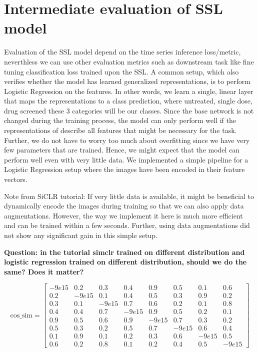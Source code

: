\documentclass[12pt,twoside,a4paper,parskip]{scrbook} %
\begin{document}
\section{Intermediate evaluation of SSL model}
Evaluation of the SSL model depend on the  time series inference loss/metric, neverthless we can use other evaluation metrics such as downstream task like fine tuning classification loss trained upon the SSL. A common setup, which also verifies whether the model has learned generalized representations, is to perform Logistic Regression on the features. In other words, we learn a single, linear layer that maps the representations to a class prediction, where untreated, single dose, drug screened these 3 categories will be our classes. Since the base network is not changed during the training process, the model can only perform well if the representations of describe all features that might be necessary for the task. Further, we do not have to worry too much about overfitting since we have very few parameters that are trained. Hence, we might expect that the model can perform well even with very little data. We implemented a  simple pipeline for a  Logistic Regression setup where the images have been encoded in their feature vectors. 

Note from SiCLR tutorial: If very little data is available, it might be beneficial to dynamically encode the images during training so that we can also apply data augmentations. However, the way we implement it here is much more efficient and can be trained within a few seconds. Further, using data augmentations did not show any significant gain in this simple setup.

\textbf{Question: in the tutorial simclr trained on different distribution and logistic regression trained on different distribution, should we do the same? Does it matter?} 

\[
\text{cos\_sim} = \begin{bmatrix} 
-9e15 & 0.2 & 0.3 & 0.4 & 0.9 & 0.5 & 0.1 & 0.6 \\ 
0.2 & -9e15 & 0.1 & 0.4 & 0.5 & 0.3 & 0.9 & 0.2 \\ 
0.3 & 0.1 & -9e15 & 0.7 & 0.6 & 0.2 & 0.1 & 0.8 \\ 
0.4 & 0.4 & 0.7 & -9e15 & 0.9 & 0.5 & 0.2 & 0.1 \\ 
0.9 & 0.5 & 0.6 & 0.9 & -9e15 & 0.7 & 0.3 & 0.2 \\ 
0.5 & 0.3 & 0.2 & 0.5 & 0.7 & -9e15 & 0.6 & 0.4 \\ 
0.1 & 0.9 & 0.1 & 0.2 & 0.3 & 0.6 & -9e15 & 0.5 \\ 
0.6 & 0.2 & 0.8 & 0.1 & 0.2 & 0.4 & 0.5 & -9e15 
\end{bmatrix}
\]
\end{document}
